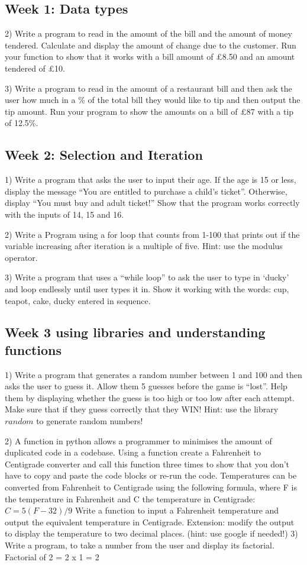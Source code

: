 \documentclass{article}
\begin{document}
	 \subsection{Week 1: Data types}
	 2) Write a program to read in the amount of the bill and the amount of money tendered. Calculate and display the amount of change due to the customer. Run your function to show that it works with a bill amount of £8.50 and an amount tendered of £10.
	 
	 3) Write a program to read in the amount of a restaurant bill and then ask the user how much in a \% of the total bill they would like to tip and then output the tip amount. Run your program to show the amounts on a bill of £87 with a tip of 12.5\%.
	 \subsection{Week 2: Selection and Iteration}
	 1) Write a program that asks the user to input their age. If the age is 15 or less, display the message “You are entitled to purchase a child’s ticket”. Otherwise, display “You must buy and adult ticket!” Show that the program works correctly with the inputs of 14, 15 and 16.
	 
	  2) Write a Program using a for loop that counts from 1-100 that prints out if the variable increasing after iteration is a multiple of five. Hint: use the modulus operator. 
	 
	 3) Write a program that uses a “while loop” to ask the user to type in ‘ducky’ and loop endlessly until user types it in. Show it working with the words: cup, teapot, cake, ducky entered in sequence.

	 \subsection{Week 3 using libraries and understanding functions}
	 1) Write a program that generates a random number between 1 and 100 and then asks the user to guess it. Allow them 5 guesses before the game is “lost”. Help them by displaying whether the guess is too high or too low after each attempt. Make sure that if they guess correctly that they WIN! Hint: use the library $random$ to generate random numbers! 
	  
	  2) A function in python allows a programmer to minimises the amount of duplicated code in a codebase. Using a function create a Fahrenheit to Centigrade converter and call this function three times to show that you don't have to copy and paste the code blocks or re-run the code. Temperatures can be converted from Fahrenheit to Centigrade using the following formula, where F is the temperature in Fahrenheit and C the temperature in Centigrade: $C = 5 (F-32) / 9$ Write a function to input a Fahrenheit temperature and output the equivalent temperature in Centigrade. Extension: modify the output to display the temperature to two decimal places. (hint: use google if needed!)
	 3) Write a program, to take a number from the user and display its factorial. 
	 Factorial of  2 = 2 x 1 = 2 
	 
\end{document}
